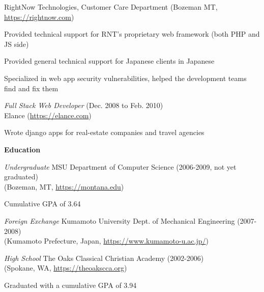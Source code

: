 \documentclass[10pt, a4paper]{article}
\begin{document}
\begin{itemize*}
    RightNow Technologies, Customer Care Department (Bozeman MT, \url{https://rightnow.com})
    \begin{itemize*}
      \item Provided technical support for RNT's proprietary web framework (both PHP and JS side)
      \item Provided general technical support for Japanese clients in Japanese
      \item Specialized in web app security vulnerabilities, helped the development teams find and fix them
    \end{itemize*}
  \item \emph{Full Stack Web Developer} (Dec. 2008 to Feb. 2010)\\
    Elance (\url{https://elance.com})
    \begin{itemize*}
      \item Wrote django apps for real-estate companies and travel agencies
    \end{itemize*}
\end{itemize*}
\textbf{Education}
\begin{itemize*}
  \item \emph{Undergraduate} MSU Department of Computer Science (2006-2009, not yet graduated)\\
    (Bozeman, MT, \url{https://montana.edu})
    \begin{itemize*}
      \item Cumulative GPA of 3.64
    \end{itemize*}
  \item \emph{Foreign Exchange} Kumamoto University Dept. of Mechanical Engineering (2007-2008)\\
    (Kumamoto Prefecture, Japan, \url{https://www.kumamoto-u.ac.jp/})
  \item \emph{High School} The Oaks Classical Christian Academy (2002-2006)\\
    (Spokane, WA, \url{https://theoakscca.org})
    \begin{itemize*}
      \item Graduated with a cumulative GPA of 3.94
    \end{itemize*}
\end{itemize*}
\end{document}
